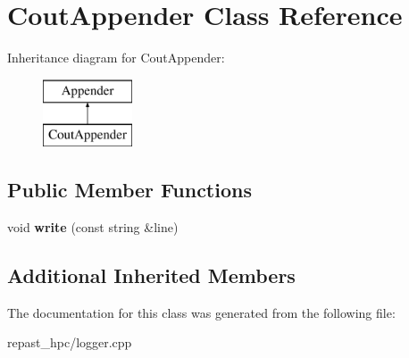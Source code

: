 \hypertarget{class_cout_appender}{\section{Cout\-Appender Class Reference}
\label{class_cout_appender}
}
Inheritance diagram for Cout\-Appender\-:\begin{figure}[H]
\begin{center}
\leavevmode
\includegraphics[height=2.000000cm]{class_cout_appender}
\end{center}
\end{figure}
\subsection*{Public Member Functions}
\begin{DoxyCompactItemize}
\item 
\hypertarget{class_cout_appender_a2297ab257bd15bd97c9805123037306b}{void {\bfseries write} (const string \&line)}\label{class_cout_appender_a2297ab257bd15bd97c9805123037306b}

\end{DoxyCompactItemize}
\subsection*{Additional Inherited Members}


The documentation for this class was generated from the following file\-:\begin{DoxyCompactItemize}
\item 
repast\-\_\-hpc/logger.\-cpp\end{DoxyCompactItemize}
